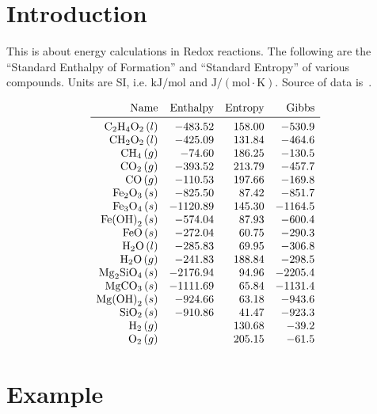 \documentclass[a4paper,14pt]{extarticle}
\def\H{{\rm H}}
\def\O{{\rm O}}
\def\C{{\rm C}}
\def\Fe{{\rm Fe}}
\def\Mg{{\rm Mg}}
\def\Si{{\rm Si}}
\begin{document}

\section{Introduction}

This is about energy calculations in Redox reactions.
The following are the ``Standard Enthalpy of Formation'' and ``Standard Entropy'' of
various compounds. Units are SI, i.e. $\text{kJ}/\text{mol}$ and $\text{J}/(\text{mol}\cdot \text{K})$.
Source of data is~\cite{nist}.

\[
\begin{array}{rrrr}
    \text{Name}      & \text{Enthalpy} & \text{Entropy} & \text{Gibbs} \\
   \midrule
    \C_2\H_4\O_2 \,(l)  &  -483.52 & 158.00  &  -530.9 \\
    \C\H_2\O_2 \,(l)    &  -425.09 & 131.84  &  -464.6 \\
    \C\H_4 \,(g)        &   -74.60 & 186.25  &  -130.5 \\
    \C\O_2 \,(g)        &  -393.52 & 213.79  &  -457.7 \\
    \C\O \,(g)          &  -110.53 & 197.66  &  -169.8 \\
    \Fe_2\O_3 \,(s)     &  -825.50 &  87.42  &  -851.7 \\
    \Fe_3\O_4 \,(s)     & -1120.89 & 145.30  & -1164.5 \\
    \Fe{(\O\H)}_2 \,(s) &  -574.04 &  87.93  &  -600.4 \\
    \Fe\O \,(s)         &  -272.04 &  60.75  &  -290.3 \\
    \H_2\O \,(l)        &  -285.83 &  69.95  &  -306.8 \\
    \H_2\O \,(g)        &  -241.83 & 188.84  &  -298.5 \\
    \Mg_2\Si\O_4 \,(s)  & -2176.94 &  94.96  & -2205.4 \\
    \Mg\C\O_3 \,(s)     & -1111.69 &  65.84  & -1131.4 \\
    \Mg{(\O\H)}_2 \,(s) &  -924.66 &  63.18  &  -943.6 \\
    \Si\O_2 \,(s)       &  -910.86 &  41.47  &  -923.3 \\
    \H_2 \,(g)          &          & 130.68  &   -39.2 \\
    \O_2 \,(g)          &          & 205.15  &   -61.5
\end{array}
\]

\section{Example}
\end{document}
